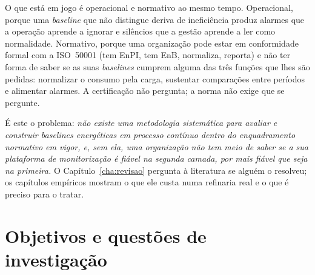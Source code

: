
O que está em jogo é operacional e normativo ao mesmo tempo.
Operacional, porque uma \emph{baseline} que não distingue deriva de
ineficiência produz alarmes que a operação aprende a ignorar e
silêncios que a gestão aprende a ler como normalidade. Normativo, porque
uma organização pode estar em conformidade formal com a ISO~50001 (tem
EnPI, tem EnB, normaliza, reporta) e não ter forma de saber se as
suas \emph{baselines} cumprem alguma das três funções que lhes são
pedidas: normalizar o consumo pela carga, sustentar comparações entre
períodos e alimentar alarmes. A certificação não pergunta; a norma não
exige que se pergunte.

É este o problema: \emph{não existe uma metodologia sistemática para
avaliar e construir \emph{baselines} energéticas em processo contínuo
dentro do enquadramento normativo em vigor, e, sem ela, uma organização
não tem meio de saber se a sua plataforma de monitorização é fiável na
segunda camada, por mais fiável que seja na primeira.} O
Capítulo~\ref{cha:revisao} pergunta à literatura se alguém o resolveu;
os capítulos empíricos mostram o que ele custa numa refinaria real e o
que é preciso para o tratar.

\section{Objetivos e questões de investigação}
\label{sec:objetivos}

